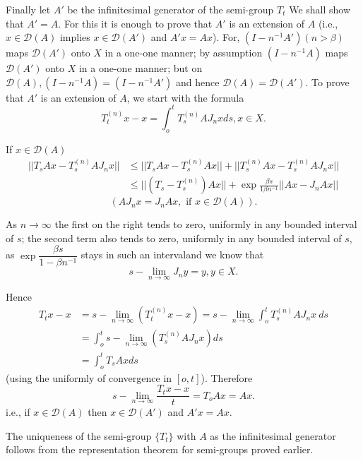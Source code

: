 Finally let $A'$ be the infinitesimal generator of the semi-group
$T_t$ We shall show that $A' =A$. For this it is enough to prove that
$A'$ is an extension of $A$ (i.e., $x \in \mathscr{D}(A)$ implies $x
\in \mathscr{D}(A')$ and $A' x = Ax$). For, $(I-n^{-1}A')(n > \beta)$
maps $\mathscr{D}(A')$ onto $X$ in a one-one manner; by assumption
$(I-n^{-1}A)$ maps $\mathscr{D}(A')$ onto $X$ in a one-one manner; but
on $\mathscr{D}(A), (I-n^{-1}A)= (I-n^{-1}A')$ and hence
$\mathscr{D}(A)= \mathscr{D}(A')$. To prove that $A'$ is an extension
of $A$, we start with the formula  
 $$
 T^{(n)}_t x-x = \int^t_o T^{(n)}_s A J_n x ds, x \in X.
 $$
 
If $x \in \mathscr{D}(A)$
\begin{align*}
 || T_s Ax- T^{(n)}_s A J_n x || & \le || T_s A x- T^{(n)}_s A x || +
 || T^{(n)}_s A x- T^{(n)}_s A J_n x || \\ 
 & \le || (T_s- T^{(n)}_s) Ax || + \exp \frac{\beta s}{1 \beta
 n^{-1}} || Ax- J_n A x || 
 \end{align*} 
 $$
 (A J_n x= J_n A x, \text{ if } x \in \mathscr{D}(A) ).
 $$
 
As $n \to \infty$ the first on the right tends to zero, uniformly in
any bounded interval of $s$; the second term also tends to zero,
uniformly in any bounded interval of $s$, as $\exp \dfrac{\beta
 s}{1-\beta n^{-1}}$ stays in such an interval\pageoriginale and we know that 
 $$
 s-\lim_{n\to \infty} J_n y=y, y \in X.
 $$
 
Hence
\begin{align*}
 T_t x-x &= s-\lim_{n \to \infty} (T^{(n)}_t x-x) = s-\lim_{n\to
  \infty} \int^t_o T^{(n)}_s A J_n x ~ ds \\ 
 &= \int^t_o s-\lim_{n\to \infty} (T^{(n)}_s A J_n x )ds \\
 &= \int^t_o T_s Ax ds 
\end{align*} 
(using the uniformly of convergence in $[o,t]$). Therefore 
$$
s-\lim\limits_{n\to \infty}\frac{T_t x-x}{t} = T_o A x=A x.
$$
i.e., if $x \in \mathscr{D}(A)$ then $x \in \mathscr{D}(A')$ and $A' x=Ax$.

The uniqueness of the semi-group $\{T_t\}$ with $A$ as the
infinitesimal generator follows from the representation theorem for
semi-groups pro\-ved earlier. 

